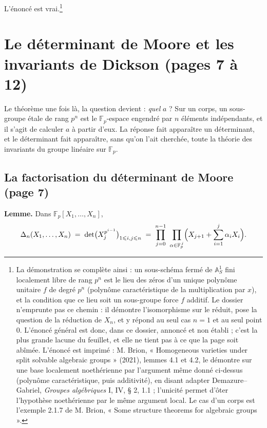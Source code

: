 \documentclass[11pt,a4paper]{article}
\begin{document}
L'énoncé est vrai.\footnote{La démonstration se complète ainsi : un
sous-schéma fermé de $\mathbb{A}^1_S$ fini localement libre de rang $p^n$ est
le lieu des zéros d'un unique polynôme unitaire $f$ de degré $p^n$ (polynôme
caractéristique de la multiplication par $x$), et la condition que ce lieu
soit un sous-groupe force $f$ additif. Le dossier n'emprunte pas ce chemin :
il démontre l'isomorphisme sur le réduit, pose la question de la réduction de
$X_n$, et y répond au seul cas $n = 1$ et au seul point $0$. L'énoncé général
est donc, dans ce dossier, annoncé et non établi ; c'est la plus grande
lacune du feuillet, et elle ne tient pas à ce que la page soit abîmée.
L'énoncé est imprimé : M. Brion, « Homogeneous varieties under split
solvable algebraic groups » (2021), lemmes 4.1 et 4.2, le démontre sur une base
localement noethérienne par l'argument même donné ci-dessus (polynôme
caractéristique, puis additivité), en disant adapter Demazure--Gabriel,
\emph{Groupes algébriques} I, IV, § 2, 1.1 ; l'unicité permet d'ôter
l'hypothèse noethérienne par le même argument local. Le cas d'un corps est
l'exemple 2.1.7 de M. Brion, « Some structure theorems for algebraic groups ».}

\section*{Le déterminant de Moore et les invariants de Dickson (pages 7 à 12)}

Le théorème une fois là, la question devient : \emph{quel} $a$ ? Sur un
corps, un sous-groupe étale de rang $p^n$ est le $\mathbb{F}_p$-espace
engendré par $n$ éléments indépendants, et il s'agit de calculer $a$ à
partir d'eux. La réponse fait apparaître un déterminant, et le déterminant
fait apparaître, sans qu'on l'ait cherchée, toute la théorie des invariants
du groupe linéaire sur $\mathbb{F}_p$.

\subsection*{La factorisation du déterminant de Moore (page 7)}

\textbf{Lemme.} Dans $\mathbb{F}_p[X_1, \dots, X_n]$,
\[
  \Delta_n(X_1, \dots, X_n) \;=\;
  \det\bigl(X_j^{p^{i-1}}\bigr)_{1 \leqslant i, j \leqslant n}
  \;=\; \prod_{j=0}^{n-1} \ \prod_{\alpha \in \mathbb{F}_p^{\,j}}
  \Bigl(X_{j+1} + \sum_{i=1}^{j} \alpha_i X_i\Bigr).
\]
\end{document}
